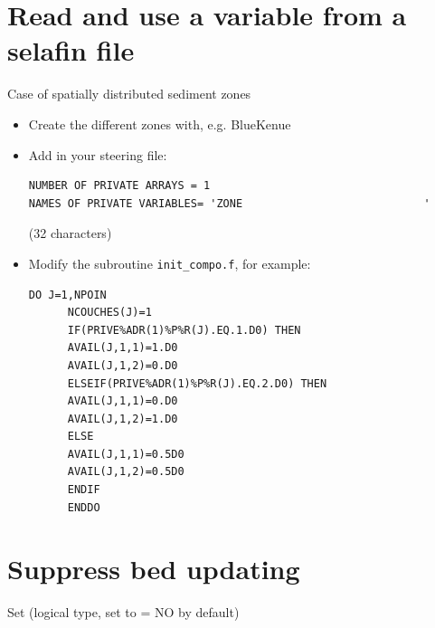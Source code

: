 \section{Read and use a variable from a selafin file}
Case of spatially distributed sediment zones

\begin{itemize}
\item Create the different zones with, e.g. BlueKenue
\item Add in your steering file:
  \begin{lstlisting}[frame=trBL]
NUMBER OF PRIVATE ARRAYS = 1
NAMES OF PRIVATE VARIABLES= 'ZONE                            '
\end{lstlisting}
(32 characters)%
\item Modify the subroutine \texttt{init\_compo.f}, for example:
\begin{lstlisting}[frame=trBL]
      DO J=1,NPOIN
      NCOUCHES(J)=1
	  IF(PRIVE%ADR(1)%P%R(J).EQ.1.D0) THEN
	  AVAIL(J,1,1)=1.D0
	  AVAIL(J,1,2)=0.D0
	  ELSEIF(PRIVE%ADR(1)%P%R(J).EQ.2.D0) THEN
	  AVAIL(J,1,1)=0.D0
	  AVAIL(J,1,2)=1.D0	 
	  ELSE 
	  AVAIL(J,1,1)=0.5D0
	  AVAIL(J,1,2)=0.5D0
	  ENDIF
      ENDDO
\end{lstlisting}
\end{itemize}



\section{Suppress bed updating}
Set  (logical type, set to {\ttfamily = NO} by default)           


